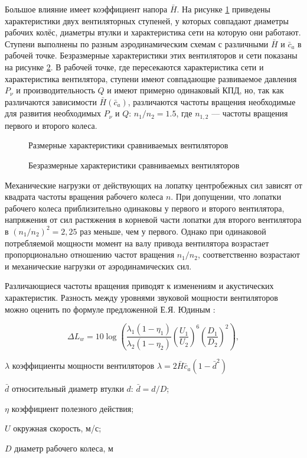 Большое влияние имеет коэффициент напора \(\bar{H}\). На рисунке \cref{fig:pq2} приведены характеристики двух вентиляторных ступеней, у которых совпадают диаметры рабочих колёс, диаметры втулки и характеристика сети на которую они работают. Ступени выполнены по разным аэродинамическим схемам с различными \(\bar{H}\) и \(\bar{c}_{a}\) в рабочей точке. Безразмерные характеристики этих вентиляторов и сети показаны на рисунке \cref{fig:pq}. В рабочей точке, где пересекаются характеристика сети и характеристика вентилятора, ступени имеют совпадающие развиваемое давления \( P_\nu \) и производительность \(Q\) и имеют примерно одинаковый КПД, но, так как различаются зависимости \(\bar{H}(\bar{c}_{a})\), различаются частоты вращения необходимые для развития необходимых \(P_{\nu}\) и \(Q\): \(n_1/n_2 = 1.5\), где \(n_{1,2}\) –-- частоты вращения первого и второго колеса.

\begin{figure}[ht]
	\centerfloat{	
		
	}
	\caption{Размерные характеристики сравниваемых вентиляторов}
	\label{fig:pq2}
\end{figure}

\begin{figure}[ht]
	\centerfloat{	
		
	}
	\caption{Безразмерные характеристики сравниваемых вентиляторов}
	\label{fig:pq}
\end{figure}


Механические нагрузки от действующих на лопатку центробежных сил зависят от квадрата частоты вращения рабочего колеса \(n\). При допущении, что лопатки рабочего колеса приблизительно одинаковы у первого и второго вентилятора, напряжения от сил растяжения в корневой части лопатки для второго вентилятора в \((n_1 / n_2)^2  = 2,25\) раз меньше, чем у первого. Однако при одинаковой потребляемой мощности момент на валу привода вентилятора возрастает пропорционально отношению частот вращения \(n_1 / n_2\), соответственно возрастают и механические нагрузки от аэродинамических сил.

Различающиеся частоты вращения приводят к изменениям и акустических характеристик. Разность между уровнями звуковой мощности вентиляторов можно оценить по формуле предложенной Е.Я. Юдиным \cite{Judin1964}:

\begin{equation}
	\Delta L_w=10\log\left( \frac{\lambda_1(1-\eta_1)}{\lambda_2(1-\eta_2)}\left(\frac{U_1}{U_2}\right)^6\left(\frac{D_1}{D_2}\right)^2 \right),
	\label{eq:dLw}
\end{equation}
\begin{eqexpl}
	\item{\(\lambda\)} коэффициенты мощности вентиляторов 	\(\lambda = 2\bar{H}\bar{c}_{a}(1-\bar{d}^2)\)
	\item{\(\bar{d}\)} относительный диаметр втулки \(d\): \(\bar{d} = d / D\);
	\item{\(\eta\)} коэффициент полезного действия;
	\item{\(U\)} окружная скорость, м/с;
	\item{\(D\)} диаметр рабочего колеса, м
	\end{eqexpl}

